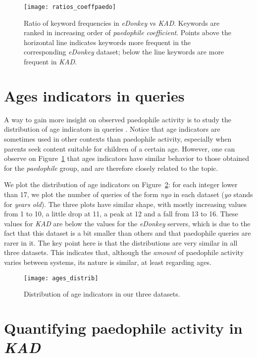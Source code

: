 \documentclass[a4paper,oneside,12pt]{article}
\newcommand{\edonkey}{{\em eDonkey}\xspace}
\newcommand{\kad}{{\em KAD}\xspace}
\newcommand{\paedocoeff}{{\em paedophile coefficient}\xspace}
\begin{document}
\begin{figure}[!ht]
\centering
\texttt{[image: ratios\_coeffpaedo]}
\caption{
Ratio of keyword frequencies in \edonkey vs \kad. Keywords are ranked in increasing order of \paedocoeff. Points above the  horizontal line indicates keywords more frequent in the corresponding \edonkey dataset; below the line keywords are more frequent in \kad. 
}
\label{fig-wordsOcc}
\end{figure}

\section{Ages indicators in queries}
\label{sec-ages}
A way to gain more insight on observed paedophile activity is to study the distribution of age indicators in queries \cite{steel09child}. Notice that age indicators are sometimes used in other contexts than paedophile activity, especially when parents seek content suitable for children of a certain age. However, one can observe on Figure~\ref{fig-wordsOcc} that ages indicators have similar behavior to those obtained for the {\em paedophile} group, and are therefore closely related to the topic. 

We plot the distribution of age indicators on Figure~\ref{fig-ages}: for each integer  lower than 17, we plot the number of queries of the form {\em nyo} in each dataset ({\em yo} stands for {\em years old}). The three plots have similar shape, with mostly increasing values from 1 to 10, a little drop at 11, a peak at 12 and a fall from 13 to 16. These values for \kad are below the values for the \edonkey servers, which is due to the fact that this dataset is a bit smaller than others and that paedophile queries are rarer in it. The key point here is that the distributions are very similar in all three datasets. This indicates that, although the {\em amount} of paedophile activity varies between systems, its nature is similar, at least regarding ages.

\begin{figure}[!ht]
\centering
\texttt{[image: ages\_distrib]}
\caption{
Distribution of age indicators in our three datasets.
}
\label{fig-ages}
\end{figure}

\section{Quantifying paedophile activity in \kad}
\label{sec-inference}
\end{document}
